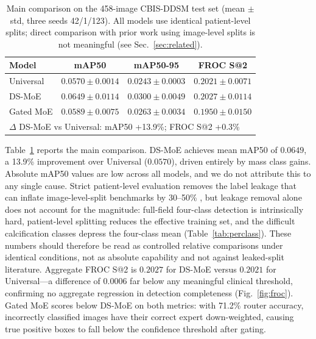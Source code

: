 \documentclass[runningheads]{llncs}
\begin{document}
\begin{table}[tb]
\caption{Main comparison on the 458-image CBIS-DDSM test set
(mean $\pm$ std, three seeds 42/1/123). All models use identical
patient-level splits; direct comparison with prior work using
image-level splits is not meaningful (see Sec.~\ref{sec:related}).}
\label{tab:main}
\centering
\begin{tabular}{lccc}
\toprule
\textbf{Model} & \textbf{mAP50} & \textbf{mAP50-95} & \textbf{FROC S@2}\\
\midrule
Universal    & $0.0570 \pm 0.0014$ & $0.0243 \pm 0.0003$ & $0.2021 \pm 0.0071$\\
DS-MoE       & $\mathbf{0.0649 \pm 0.0114}$ & $\mathbf{0.0300 \pm 0.0049}$ & $0.2027 \pm 0.0114$\\
Gated MoE    & $0.0589 \pm 0.0075$ & $0.0263 \pm 0.0034$ & $0.1950 \pm 0.0150$\\
\midrule
\multicolumn{4}{l}{\small $\Delta$ DS-MoE vs Universal: mAP50 +13.9\%; FROC S@2 +0.3\%}\\
\bottomrule
\end{tabular}
\end{table}

Table~\ref{tab:main} reports the main comparison. DS-MoE achieves mean
mAP50 of $0.0649$, a 13.9\% improvement over Universal ($0.0570$),
driven entirely by mass class gains. Absolute mAP50 values are low
across all models, and we do not attribute this to any single cause.
Strict patient-level evaluation removes the label leakage that can
inflate image-level-split benchmarks by 30--50\% \cite{lee2017curated},
but leakage removal alone does not account for the magnitude: full-field
four-class detection is intrinsically hard, patient-level splitting
reduces the effective training set, and the difficult calcification
classes depress the four-class mean (Table~\ref{tab:perclass}). These numbers should therefore be read as controlled relative
comparisons under identical conditions, not as absolute capability and
not against leaked-split literature. Aggregate FROC S@2 is $0.2027$
for DS-MoE versus $0.2021$ for Universal---a difference of $0.0006$
far below any meaningful clinical threshold, confirming no aggregate
regression in detection completeness (Fig.~\ref{fig:froc}). Gated MoE
scores below DS-MoE on both metrics: with 71.2\% router accuracy,
incorrectly classified images have their correct expert down-weighted,
causing true positive boxes to fall below the confidence threshold
after gating.
\end{document}

